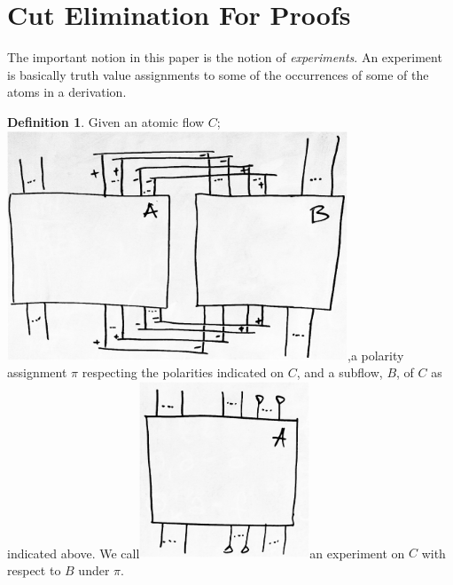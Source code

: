 \documentclass[a4paper]{amsart}
\theoremstyle{remark}
\theoremstyle{definition}
\newtheorem{defi}[thm]{Definition}
\begin{document}
\section{Cut Elimination For Proofs}

The important notion in this paper is the notion of \emph{experiments}. An experiment is basically truth value assignments to some of the occurrences of some of the atoms in a derivation.

\begin{defi}\label{DefExperimentFlow}
Given an atomic flow $C$;\newline\includegraphics[width=4in]{original.eps},\newline a polarity assignment $\pi$ respecting the polarities indicated on $C$, and a subflow, $B$, of $C$ as indicated above. We call\newline\includegraphics[width=2in]{experiment.eps}\newline an experiment on $C$ with respect to $B$ under $\pi$.
\end{defi}
\end{document}

